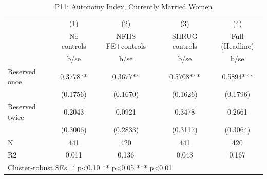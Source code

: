 \begin{table}[htbp]\centering
\def\sym#1{\ifmmode^{#1}\else\(^{#1}\)\fi}
\caption{P11: Autonomy Index, Currently Married Women}
\begin{tabular}{l*{4}{c}}
\toprule
            &\multicolumn{1}{c}{(1)}   &\multicolumn{1}{c}{(2)}   &\multicolumn{1}{c}{(3)}   &\multicolumn{1}{c}{(4)}   \\
            & No controls   &NFHS FE+controls   &SHRUG controls   &Full (Headline)   \\
            &        b/se   &        b/se   &        b/se   &        b/se   \\
\midrule
Reserved once&      0.3778** &      0.3677** &      0.5708***&      0.5894***\\
            &    (0.1756)   &    (0.1670)   &    (0.1626)   &    (0.1796)   \\
Reserved twice&      0.2043   &      0.0921   &      0.3478   &      0.2661   \\
            &    (0.3006)   &    (0.2833)   &    (0.3117)   &    (0.3064)   \\
\midrule
N           &         441   &         420   &         441   &         420   \\
R2          &       0.011   &       0.136   &       0.043   &       0.167   \\
\bottomrule
\multicolumn{5}{l}{\footnotesize Cluster-robust SEs. * p<0.10 ** p<0.05 *** p<0.01}\\
\end{tabular}
\end{table}
